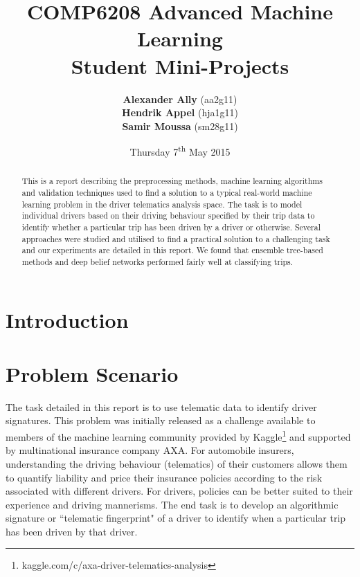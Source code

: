 \documentclass[a4paper, 11pt, twocolumn]{report}
\begin{document}
\lstset{language=Matlab, basicstyle=\small}
\title{\textbf{COMP6208 Advanced Machine Learning} \\
{\Large Student Mini-Projects}}

\author{\textbf{Alexander Ally} (aa2g11)\\
\textbf{Hendrik Appel} (hja1g11)\\
\textbf{Samir Moussa} (sm28g11)}

\date{Thursday 7\textsuperscript{th} May 2015}
\maketitle

\begin{abstract}

This is a report describing the preprocessing methods, machine learning algorithms and validation techniques used to find a solution to a typical real-world machine learning problem in the driver telematics analysis space.
The task is to model individual drivers based on their driving behaviour specified by their trip data to identify whether a particular trip has been driven by a driver or otherwise.
Several approaches were studied and utilised to find a practical solution to a challenging task and our experiments are detailed in this report.
We found that ensemble tree-based methods and deep belief networks performed fairly well at classifying trips.

\end{abstract}

\section{Introduction}





\section{Problem Scenario}

The task detailed in this report is to use telematic data to identify driver signatures.
This problem was initially released as a challenge available to members of the machine learning community provided by Kaggle\footnote{kaggle.com/c/axa-driver-telematics-analysis} and supported by multinational insurance company AXA.
For automobile insurers, understanding the driving behaviour (telematics) of their customers allows them to quantify liability and price their insurance policies according to the risk associated with different drivers.
For drivers, policies can be better suited to their experience and driving mannerisms.
The end task is to develop an algorithmic signature or ``telematic fingerprint" of a driver to identify when a particular trip has been driven by that driver.
\end{document}
